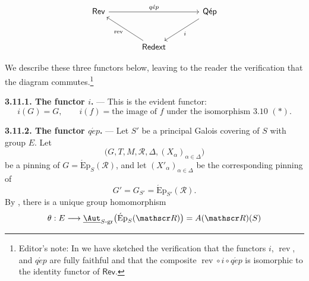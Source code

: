 \[
\begin{tikzcd}[column sep=large,row sep=large]
\mathsf{Rev}
  \arrow[rr,"q\acute{e}p"]
&&
\mathsf{Q\acute{e}p}
  \arrow[dl,"i"]
\\
&
\mathsf{Redext}
  \arrow[ul,"\operatorname{rev}"]
&
\end{tikzcd}


\]

We describe these three functors below, leaving to the reader the
verification that the diagram commutes.\footnote{Editor's note: In
 we have sketched the verification that the functors \(i\),
\(\operatorname{rev}\), and \(q\acute{e}p\) are fully faithful and
that the composite
\(\operatorname{rev}\circ i\circ q\acute{e}p\) is isomorphic to the
identity functor of \(\mathsf{Rev}\).}

\medskip\noindent\textbf{3.11.1. The functor \(i\).} ---
This is the evident functor:
\[
  i(G)=G,
  \qquad
  i(f)=\text{the image of \(f\) under the isomorphism 3.10 \((*)\)}.
\]

\medskip\noindent\textbf{3.11.2. The functor
\(q\acute{e}p\).} ---
Let \(S'\) be a principal Galois covering of \(S\) with group \(E\).
Let
\[
  \bigl(G,T,M,\mathscr R,\Delta,
    (X_\alpha)_{\alpha\in\Delta}\bigr)
\]
be a pinning of
\(G=\operatorname{\acute{E}p}_S(\mathscr R)\), and let
\((X'_\alpha)_{\alpha\in\Delta}\) be the corresponding pinning of
\[
  G'=G_{S'}=\operatorname{\acute{E}p}_{S'}(\mathscr R).
\]
By , there is a unique group homomorphism
\[
  \theta:E
  \longrightarrow
  \underline{\Aut}_{S\text{-}\mathrm{gr}}
    \bigl(\operatorname{\acute{E}p}_S(\mathscr R)\bigr)
  =A(\mathscr R)(S)
\]


